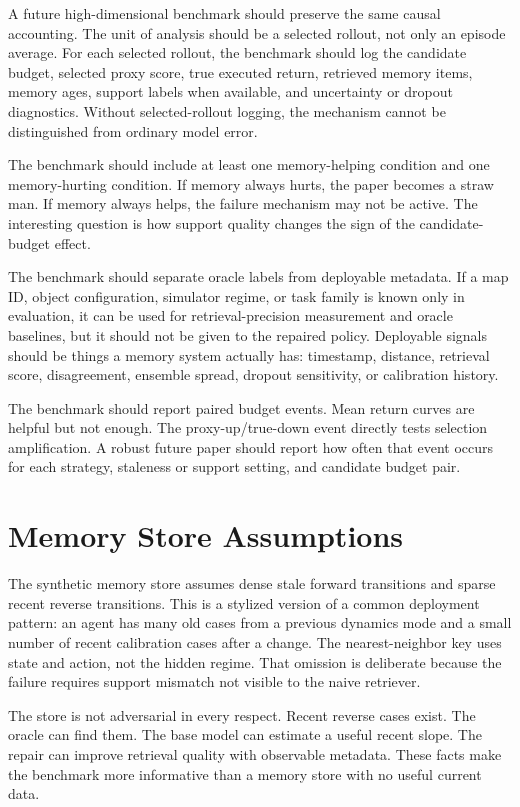 \documentclass{article}
\begin{document}
A future high-dimensional benchmark should preserve the same causal
accounting. The unit of analysis should be a selected rollout, not only an
episode average. For each selected rollout, the benchmark should log the
candidate budget, selected proxy score, true executed return, retrieved memory
items, memory ages, support labels when available, and uncertainty or dropout
diagnostics. Without selected-rollout logging, the mechanism cannot be
distinguished from ordinary model error.

The benchmark should include at least one memory-helping condition and one
memory-hurting condition. If memory always hurts, the paper becomes a straw
man. If memory always helps, the failure mechanism may not be active. The
interesting question is how support quality changes the sign of the
candidate-budget effect.

The benchmark should separate oracle labels from deployable metadata. If a map
ID, object configuration, simulator regime, or task family is known only in
evaluation, it can be used for retrieval-precision measurement and oracle
baselines, but it should not be given to the repaired policy. Deployable
signals should be things a memory system actually has: timestamp, distance,
retrieval score, disagreement, ensemble spread, dropout sensitivity, or
calibration history.

The benchmark should report paired budget events. Mean return curves are
helpful but not enough. The proxy-up/true-down event directly tests selection
amplification. A robust future paper should report how often that event occurs
for each strategy, staleness or support setting, and candidate budget pair.

\section{Memory Store Assumptions}
\label{app:memory-store}

The synthetic memory store assumes dense stale forward transitions and sparse
recent reverse transitions. This is a stylized version of a common deployment
pattern: an agent has many old cases from a previous dynamics mode and a small
number of recent calibration cases after a change. The nearest-neighbor key
uses state and action, not the hidden regime. That omission is deliberate
because the failure requires support mismatch not visible to the naive
retriever.

The store is not adversarial in every respect. Recent reverse cases exist.
The oracle can find them. The base model can estimate a useful recent slope.
The repair can improve retrieval quality with observable metadata. These facts
make the benchmark more informative than a memory store with no useful current
data.
\end{document}
